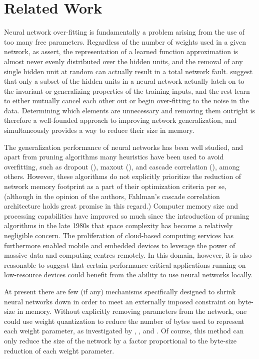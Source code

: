 \section{Related Work}
Neural network over-fitting is fundamentally a problem arising from the use of too many free parameters. Regardless of the number of weights used in a given network, as \cite{segee1991fault} assert, the representation of a learned function approximation is almost never evenly distributed over the hidden units, and the removal of any single hidden unit at random can actually result in a total network fault. \cite{mozer1989using} suggest that only a subset of the hidden units in a neural network actually latch on to the invariant or generalizing properties of the training inputs, and the rest learn to either mutually cancel each other out or begin over-fitting to the noise in the data. Determining which elements are unnecessary and removing them outright is therefore a well-founded approach to improving network generalization, and simultaneously provides a way to reduce their size in memory. 


The generalization performance of neural networks has been well studied, and apart from pruning algorithms many heuristics have been used to avoid overfitting, such as dropout (\cite{srivastava2014dropout}), maxout (\cite{goodfellow2013maxout}), and cascade correlation (\cite{fahlman1989cascade}), among others. However, these algorithms do not explicitly prioritize the reduction of network memory footprint as a part of their optimization criteria per se, (although in the opinion of the authors, Fahlman's cascade correlation architecture holds great promise in this regard.) Computer memory size and processing capabilities have improved so much since the introduction of pruning algorithms in the late 1980s that space complexity has become a relatively negligible concern. The proliferation of cloud-based computing services has furthermore enabled mobile and embedded devices to leverage the power of massive data and computing centres remotely. In this domain, however, it is also reasonable to suggest that certain performance-critical applications running on low-resource devices could benefit from the ability to use neural networks locally. 

At present there are few (if any) mechanisms specifically designed to shrink neural networks down in order to meet an externally imposed constraint on byte-size in memory. Without explicitly removing parameters from the network, one could use weight quantization to reduce the number of bytes used to represent each weight parameter, as investigated by \cite{balzer1991weight}, \cite{dundar1994effects}, and \cite{hoehfeld1992learning}. Of course, this method can only reduce the size of the network by a factor proportional to the byte-size reduction of each weight parameter. 

